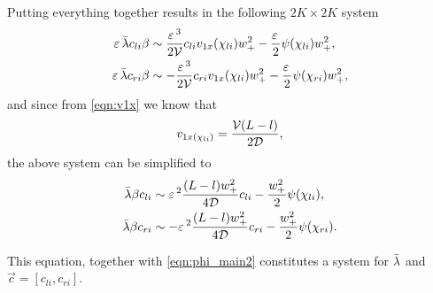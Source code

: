 Putting everything together results in the following $2K\times 2K$ system
% 
\begin{equation*}
\begin{split}
\begin{aligned}
  \varepsilon\,\bar{\lambda} c_{li}\beta &\sim \frac{\varepsilon\,^3}{2\mathcal{V}}c_{li}v_{1x}(\chi_{li})w_+^2 - \frac{\varepsilon\,}{2}\psi(\chi_{li})w_+^2,\\
  \varepsilon\,\bar{\lambda} c_{ri}\beta&\sim - \frac{\varepsilon\,^3}{2\mathcal{V}}c_{ri}v_{1x}(\chi_{li})w_+^2 - \frac{\varepsilon\,}{2}\psi(\chi_{ri})w_+^2,
\end{aligned}
\end{split}
\end{equation*}
% 
and since from \eqref{eqn:v1x} we know that 
% 
\[
  v_{1x(\chi_{li})} = \frac{\mathcal{V}(L-l)}{2\mathcal{D}},
\]
% 
the above system can be simplified to 
% 
\begin{equation}
\label{eqn:system1}
\begin{split}
\begin{aligned}
  \bar{\lambda}\beta c_{li} &\sim \varepsilon\,^2\frac{(L-l)w_+^2}{4\mathcal{D}}c_{li} - \frac{w_+^2}{2}\psi(\chi_{li}),\\
  \bar{\lambda}\beta c_{ri}&\sim - \varepsilon\,^2\frac{(L-l)w_+^2}{4\mathcal{D}}c_{ri} - \frac{w_+^2}{2}\psi(\chi_{ri}).
\end{aligned}
\end{split}
\end{equation}
% 

This equation, together with \eqref{eqn:phi_main2} constitutes a system for $\bar{\lambda}$ and $\vec{c} = [c_{li},c_{ri}]$. 

